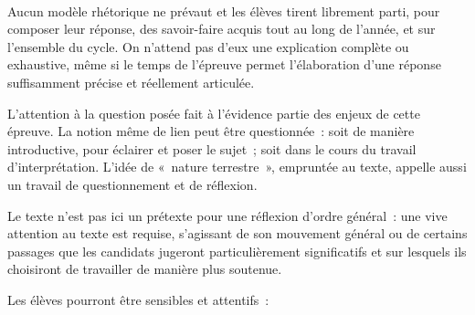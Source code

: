 \vfill{~}\clearpage

{Aucun modèle rhétorique ne prévaut et les élèves tirent librement parti, pour
composer leur réponse, des savoir-faire acquis tout au long de l'année, et sur
l'ensemble du cycle. On n'attend pas d'eux une explication complète ou exhaustive,
même si le temps de l'épreuve permet l'élaboration d'une réponse suffisamment
précise et réellement articulée.

L'attention à la question posée fait à l'évidence partie des enjeux de cette épreuve.
La notion même de lien peut être questionnée~: soit de manière introductive, pour
éclairer et poser le sujet~; soit dans le cours du travail d'interprétation. L'idée de
«~nature terrestre~», empruntée au texte, appelle aussi un travail de questionnement et
de réflexion.

Le texte n'est pas ici un prétexte pour une réflexion d'ordre général~: une vive attention
au texte est requise, s'agissant de son mouvement général ou de certains passages que
les candidats jugeront particulièrement significatifs et sur lesquels ils choisiront de
travailler de manière plus soutenue.

Les élèves pourront être sensibles et attentifs~:

}
